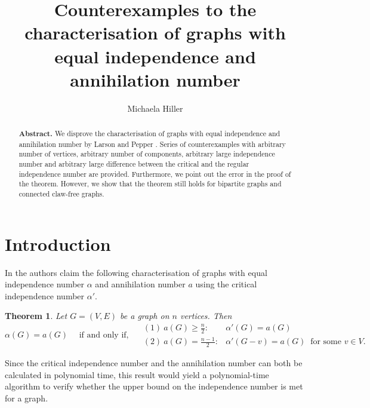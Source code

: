 \documentclass{scrartcl}
\title{Counterexamples to the characterisation of graphs with equal independence and annihilation number}
\author[]{Michaela Hiller}
\affil[]{\small Lehrstuhl II f\"ur Mathematik, RWTH Aachen, 52062 Aachen, Germany }
\date{\vspace{-5ex}}
\newtheorem{theorem}[defsatzusw]{Theorem}
\begin{document}
	\maketitle
	
	
	\begin{abstract}\noindent
		\textbf{Abstract.}
		We disprove the characterisation of graphs with equal independence and annihilation number by Larson and Pepper \cite{LarsonPepper2011}. 
		Series of counterexamples with arbitrary number of vertices, arbitrary number of components, arbitrary large independence number and arbitrary large difference between the critical and the regular independence number are provided. 
		Furthermore, we point out the error in the proof of the theorem.
		However, we show that the theorem still holds for bipartite graphs and connected claw-free graphs.
	\end{abstract}
	
	
	
	
	\section{Introduction}
	
	In \cite{LarsonPepper2011} the authors claim the following characterisation of graphs with equal independence number $\alpha$ and annihilation number $a$ using the critical independence number $\alpha'$.
	
	\begin{theorem}\textnormal{\cite{LarsonPepper2011}}\label{falsch}
		Let $G=(V,E)$ be a graph on $n$ vertices. Then $$\alpha(G)=a(G) \quad\text{ if and only if, }\quad	
				\begin{array}{ll}
					(1)~ a(G)\geq \frac n2:& \alpha'(G)=a(G)\\[2mm]
					(2)~ a(G)= \frac{n-1}{2}:& \alpha'(G-v)=a(G) ~\text{ for some } v\in V.
				\end{array}$$
	\end{theorem}
	
	\noindent
	Since the critical independence number and the annihilation number can both be calculated in polynomial time, this result would yield a polynomial-time algorithm to verify whether the upper bound on the independence number is met for a graph.\\
	
\end{document}
